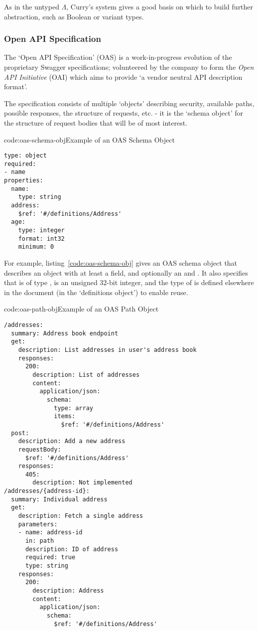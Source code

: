 As in the untyped $\Lambda$, Curry's system gives a good basis on which to build further abstraction, such as Boolean or variant types. \cite{tpl}

\subsubsection{Open API Specification}\label{OAS}

The `Open API Specification' (OAS) is a work-in-progress evolution of the proprietary Swagger specifications; volunteered by the company to form the \emph{Open API Initiative} (OAI) which aims to provide `a vendor neutral API description format'. \cite{about_oai}

The specification consists of multiple `objects' describing security, available paths, possible responses, the structure of requests, etc. - it is the `schema object' for the structure of request bodies that will be of most interest.

\begin{codelisting}{code:oas-schema-obj}{Example of an OAS Schema Object}
\begin{verbatim}
type: object
required:
- name
properties:
  name:
    type: string
  address:
    $ref: '#/definitions/Address'
  age:
    type: integer
    format: int32
    minimum: 0
\end{verbatim}
\end{codelisting}

For example, listing~\ref{code:oas-schema-obj} gives an OAS schema object that describes an object with at least a  field, and optionally an  and . It also specifies that  is of type ,  is an unsigned $32$-bit integer, and the type of  is defined elsewhere in the document (in the `definitions object') to enable reuse.

\begin{codelisting}{code:oas-path-obj}{Example of an OAS Path Object}
\begin{verbatim}
/addresses:
  summary: Address book endpoint
  get:
    description: List addresses in user's address book
    responses:
      200:
        description: List of addresses
        content:
          application/json:
            schema:
              type: array
              items:
                $ref: '#/definitions/Address' 
  post:
    description: Add a new address
    requestBody:
      $ref: '#/definitions/Address'
    responses:
      405:
        description: Not implemented
/addresses/{address-id}:
  summary: Individual address
  get:
    description: Fetch a single address
    parameters:
    - name: address-id
      in: path
      description: ID of address
      required: true
      type: string
    responses:
      200:
        description: Address
        content:
          application/json:
            schema:
              $ref: '#/definitions/Address'
\end{verbatim}
\end{codelisting}

